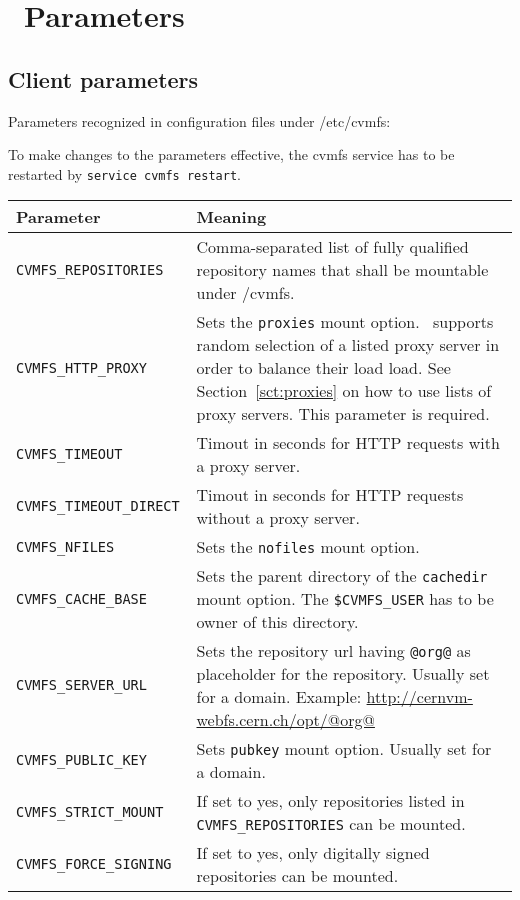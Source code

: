 \chapter{\cvmfs\ Parameters}
\label{apx:parameters}

\section{Client parameters}
Parameters recognized in configuration files under /etc/cvmfs:

To make changes to the parameters effective, the cvmfs service has to be restarted by \lstinline{service cvmfs restart}.
\begin{table}
	\begin{center}
		\begin{tabularx}{\linewidth}{lX}
			{\bf\centering Parameter} & {\bf\centering Meaning} \\\hline
			\tt CVMFS\_REPOSITORIES & Comma-separated list of fully qualified repository names that shall be mountable under /cvmfs.\\
			\tt CVMFS\_HTTP\_PROXY & Sets the \texttt{proxies} mount option. \cvmfs\ supports random selection of a listed proxy server in order to balance their load load. See Section~\ref{sct:proxies} on how to use lists of proxy servers.  This parameter is required.\\
			\tt CVMFS\_TIMEOUT & Timout in seconds for HTTP requests with a proxy server.\\
			\tt CVMFS\_TIMEOUT\_DIRECT & Timout in seconds for HTTP requests without a proxy server.\\
			\tt CVMFS\_NFILES & Sets the \texttt{nofiles} mount option.\\
			\tt CVMFS\_CACHE\_BASE & Sets the parent directory of the \texttt{cachedir} mount option. The \texttt{\$CVMFS\_USER} has to be owner of this directory.\\
			\tt CVMFS\_SERVER\_URL & Sets the repository url having \texttt{@org@} as placeholder for the repository. Usually set for a domain. Example: \url{http://cernvm-webfs.cern.ch/opt/@org@} \\
			\tt CVMFS\_PUBLIC\_KEY & Sets \texttt{pubkey} mount option.  Usually set for a domain. \\
			\tt CVMFS\_STRICT\_MOUNT & If set to yes, only repositories listed in \texttt{CVMFS\_REPOSITORIES} can be mounted. \\
			\tt CVMFS\_FORCE\_SIGNING & If set to yes, only digitally signed repositories can be mounted. \\

\end{tabularx}
\end{center}
\end{table}
